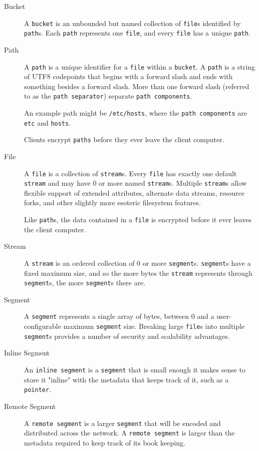 \documentclass[a4paper,10pt]{article} \usepackage[utf8]{inputenc}
\newcommand{\x}[1]{{\tt #1}} \newcommand{\code}[1]{{\tt #1}}
\begin{document}
\begin{description}
\item[Bucket] A \x{bucket} is an unbounded but named
collection of \x{file}s identified by \x{path}s. Each \x{path} represents one
\x{file}, and every \x{file} has a unique \x{path}.

\item[Path] A \x{path} is a unique identifier for a \x{file} within a
\x{bucket}. A \x{path} is a string of UTF8 codepoints that begins with a forward
slash and ends with something besides a forward slash. More than one forward
slash (referred to as the \x{path separator}) separate \x{path components}.

An example path might be \code{/etc/hosts}, where the \x{path components} are
\code{etc} and \code{hosts}.

Clients encrypt \x{paths} before they ever leave the client computer.

\item[File] A \x{file} is a collection of \x{stream}s. Every \x{file} has
exactly one default \x{stream} and may have 0 or more named \x{stream}s.
Multiple \x{stream}s allow flexible support of extended attributes, alternate
data streams, resource forks, and other slightly more esoteric filesystem
features.

Like \x{path}s, the data contained in a \x{file} is encrypted before it ever
leaves the client computer.

\item[Stream] A \x{stream} is an ordered collection of 0 or more \x{segment}s.
\x{segment}s have a fixed maximum size, and so the more bytes the \x{stream}
represents through \x{segment}s, the more \x{segment}s there are.

\item[Segment] A \x{segment} represents a single array of bytes, between 0 and a
user-configurable maximum \x{segment} size. Breaking large \x{file}s into
multiple \x{segment}s provides a number of security and scalability advantages.

\item[Inline Segment] An \x{inline segment} is a \x{segment} that is small
enough it makes sense to store it "inline" with the metadata that keeps track of
it, such as a \x{pointer}.

\item[Remote Segment] A \x{remote segment} is a larger \x{segment} that will be
encoded and distributed across the network. A \x{remote segment} is larger than
the metadata required to keep track of its book keeping.


\end{description}
\end{document}
